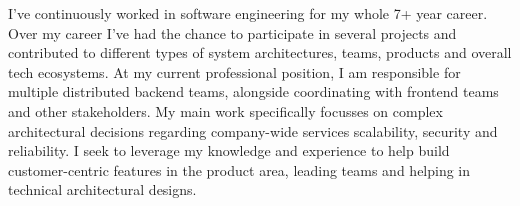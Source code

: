 

\begin{cvparagraph}

I’ve continuously worked in software engineering for my whole 7+ year career.\newline\newline
Over my career I’ve had the chance to participate in several projects and contributed to different types of system architectures, teams, products and overall tech ecosystems.\newline\newline
At my current professional position, I am responsible for multiple distributed backend teams, alongside coordinating with frontend teams and other stakeholders. My main work specifically focusses on complex architectural decisions regarding company-wide services scalability, security and reliability.\newline\newline
I seek to leverage my knowledge and experience to help build customer-centric features in the product area, leading teams and helping in technical architectural designs.
\end{cvparagraph}
